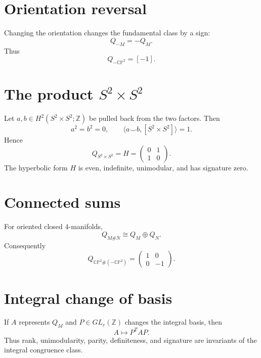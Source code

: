 \section{Orientation reversal}
Changing the orientation changes the fundamental class by a sign:
\[
Q_{-M}=-Q_M.
\]
Thus
\[
Q_{-\mathbb{CP}^2}=[-1].
\]

\section{The product $S^2\times S^2$}
Let $a,b\in H^2(S^2\times S^2;\mathbb Z)$ be pulled back from the two factors.
Then
\[
a^2=b^2=0,\qquad
\langle a\smile b,[S^2\times S^2]\rangle=1.
\]
Hence
\[
Q_{S^2\times S^2}
=
H
=
\begin{pmatrix}
0&1\\
1&0
\end{pmatrix}.
\]
The hyperbolic form $H$ is even, indefinite, unimodular, and has signature
zero.

\section{Connected sums}
For oriented closed $4$-manifolds,
\[
Q_{M\#N}\cong Q_M\oplus Q_N.
\]
Consequently
\[
Q_{\mathbb{CP}^2\#(-\mathbb{CP}^2)}
=
\begin{pmatrix}
1&0\\
0&-1
\end{pmatrix}.
\]

\section{Integral change of basis}
If $A$ represents $Q_M$ and $P\in GL_r(\mathbb Z)$ changes the integral basis,
then
\[
A\longmapsto P^TAP.
\]
Thus rank, unimodularity, parity, definiteness, and signature are invariants of
the integral congruence class.

